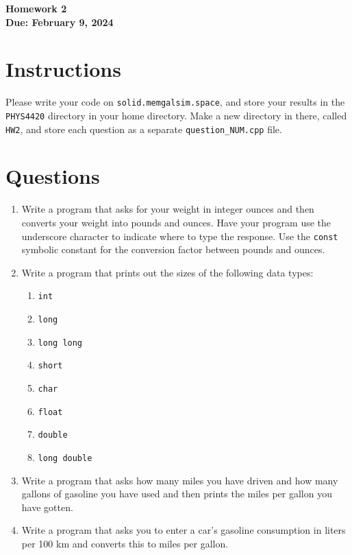 \documentclass[11pt]{article}
\begin{document}
\begin{center}
\textbf{\Large Homework 2}\\
\textbf{Due: February 9, 2024}\\
\end{center}
\section*{Instructions}
Please write your code on \texttt{solid.memgalsim.space}, and store your results
in the \texttt{PHYS4420} directory in your home directory.  Make a new directory in there, called \texttt{HW2}, and 
store each question as a separate \texttt{question\_NUM.cpp} file.
\section*{Questions}
\begin{enumerate}
    \item Write a program that asks for your weight in integer ounces and then
        converts your weight into pounds and ounces.  Have your program use the
        underscore character to indicate where to type the response. Use the
        \texttt{const} symbolic constant for the conversion factor between
        pounds and ounces.
    \item Write a program that prints out the sizes of the following data types:
        \begin{enumerate}
            \item \texttt{int}
            \item \texttt{long}
            \item \texttt{long long}
            \item \texttt{short}
            \item \texttt{char}
            \item \texttt{float}
            \item \texttt{double}
            \item \texttt{long double}
        \end{enumerate}
    \item Write a program that asks how many miles you have driven and how many
        gallons of gasoline you have used and then prints the miles per gallon
        you have gotten.
    \item Write a program that asks you to enter a car's gasoline consumption in
        liters per 100 km and converts this to miles per gallon.
\end{enumerate}
\end{document}
